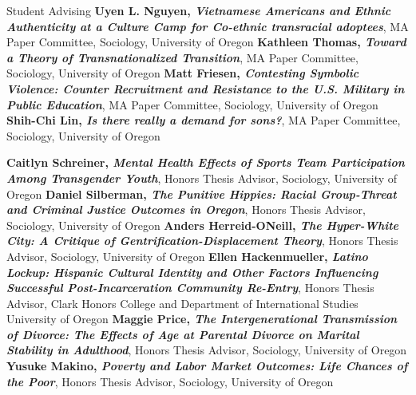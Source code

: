 \begin{rubric}{Student Advising}
\entry*[2011] \textbf{Uyen L. Nguyen, \emph{Vietnamese Americans and Ethnic Authenticity at a Culture Camp for Co-ethnic transracial adoptees}}, MA Paper Committee, Sociology, University of Oregon  
\entry*[2010] \textbf{Kathleen Thomas, \emph{Toward a Theory of Transnationalized Transition}}, MA Paper Committee, Sociology, University of Oregon  
\entry*[2010] \textbf{Matt Friesen, \emph{Contesting Symbolic Violence: Counter Recruitment and Resistance to the U.S. Military in Public Education}}, MA Paper Committee, Sociology, University of Oregon  
\entry*[2009] \textbf{Shih-Chi Lin, \emph{Is there really a demand for sons?}}, MA Paper Committee, Sociology, University of Oregon  


\entry*[2023] \textbf{Caitlyn Schreiner, \emph{Mental Health Effects of Sports Team Participation Among Transgender Youth}}, Honors Thesis Advisor, Sociology, University of Oregon  
\entry*[2016] \textbf{Daniel Silberman, \emph{The Punitive Hippies: Racial Group-Threat and Criminal Justice Outcomes in Oregon}}, Honors Thesis Advisor, Sociology, University of Oregon  
\entry*[2015] \textbf{Anders Herreid-O\textquotesingle{}Neill, \emph{The Hyper-White City: A Critique of Gentrification-Displacement Theory}}, Honors Thesis Advisor, Sociology, University of Oregon  
\entry*[2011] \textbf{Ellen Hackenmueller, \emph{Latino Lockup: Hispanic Cultural Identity and Other Factors Influencing Successful Post-Incarceration Community Re-Entry}}, Honors Thesis Advisor, Clark Honors College and Department of International Studies University of Oregon  
\entry*[2009] \textbf{Maggie Price, \emph{The Intergenerational Transmission of Divorce: The Effects of Age at Parental Divorce on Marital Stability in Adulthood}}, Honors Thesis Advisor, Sociology, University of Oregon  
\entry*[2009] \textbf{Yusuke Makino, \emph{Poverty and Labor Market Outcomes: Life Chances of the Poor}}, Honors Thesis Advisor, Sociology, University of Oregon  

\end{rubric}